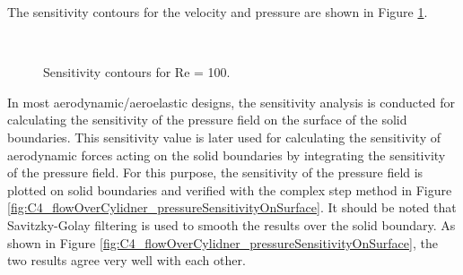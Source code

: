 %
The sensitivity contours for the velocity and pressure are shown in Figure \ref{fig:C4_flowOverCylinderSensitivityContour}.
%
\begin{figure}[H]
    \centering
    \quad
    \\
    \caption{Sensitivity contours for Re = 100.}
    \label{fig:C4_flowOverCylinderSensitivityContour}
\end{figure}
%
In most aerodynamic/aeroelastic designs, the sensitivity analysis is conducted for calculating the sensitivity of the pressure field on the surface of the solid boundaries. This sensitivity value is later used for calculating the sensitivity of aerodynamic forces acting on the solid boundaries by integrating the sensitivity of the pressure field. For this purpose, the sensitivity of the pressure field is plotted on solid boundaries and verified with the complex step method in Figure \ref{fig:C4_flowOverCylidner_pressureSensitivityOnSurface}. It should be noted that Savitzky-Golay filtering is used to smooth the results over the solid boundary. As shown in Figure \ref{fig:C4_flowOverCylidner_pressureSensitivityOnSurface}, the two results agree very well with each other.
